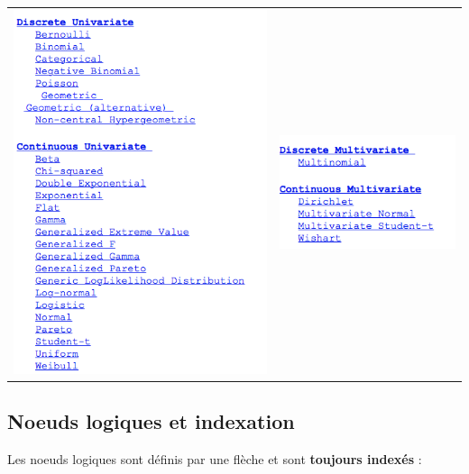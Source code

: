 \begin{tabular}{ll}
\includegraphics[scale=0.4]{figures/openbugsjags/tab1.png} & \includegraphics[scale=0.4]{figures/openbugsjags/tab2.png}
\end{tabular}

\subsection{Noeuds logiques et indexation}

 Les noeuds logiques sont définis par une flèche et sont {\bf toujours indexés} : \\
 
 \begin{center} 
 \end{center} 

